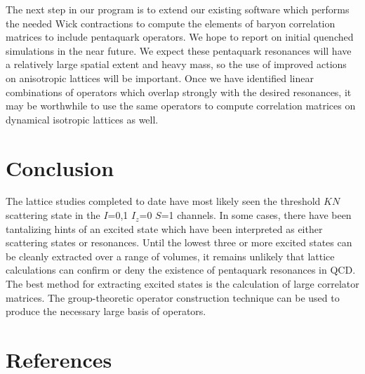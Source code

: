\documentclass[letterpaper]{jpconf}
\begin{document}
The next step in our program is to extend our existing software
which performs the needed Wick contractions to compute the elements
of baryon correlation matrices to include pentaquark operators.
We hope to report on initial quenched simulations in the near future.
We expect these pentaquark resonances will have a relatively large
spatial extent and heavy mass, so the use of improved actions
on anisotropic lattices will be important.  Once we have identified
linear combinations of operators which overlap strongly with the desired
resonances, it may be worthwhile to use the same operators to compute
correlation matrices on dynamical isotropic lattices as well.

\section{\label{sec:conclusion}Conclusion}

The lattice studies completed to date have most likely seen the threshold $KN$
scattering state in the $I$=0,1 $I_z$=0 $S$=1 channels.  In some cases, there
have been tantalizing hints of an excited state which have been interpreted as
either scattering states or resonances.  Until the lowest three or more
excited states can be cleanly extracted over a range of volumes, it remains
unlikely that lattice calculations can confirm or deny the existence of
pentaquark resonances in QCD.  The best method for extracting excited
states is the calculation of large correlator matrices.  The group-theoretic
operator construction technique can be used to produce the necessary
large basis of operators.


\section*{References}



\end{document}
